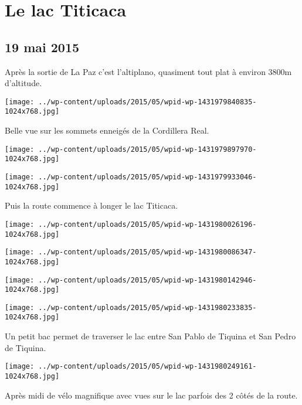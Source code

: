 \chapter{Le lac Titicaca}
\section*{19 mai 2015}
Après la sortie de La Paz c'est l'altiplano, quasiment tout plat à environ 3800m d'altitude. \newline
 \newline
\centerline{\texttt{[image: ../wp-content/uploads/2015/05/wpid-wp-1431979840835-1024x768.jpg]} } 
 \newline
 Belle vue sur les sommets enneigés de la Cordillera Real. \newline
 \newline
\centerline{\texttt{[image: ../wp-content/uploads/2015/05/wpid-wp-1431979897970-1024x768.jpg]} } 
 \newline
 \newline
\centerline{\texttt{[image: ../wp-content/uploads/2015/05/wpid-wp-1431979933046-1024x768.jpg]} } 
 \newline
 Puis la route commence à longer le lac Titicaca. \newline
 \newline
\centerline{\texttt{[image: ../wp-content/uploads/2015/05/wpid-wp-1431980026196-1024x768.jpg]} } 
 \newline
 \newline
\centerline{\texttt{[image: ../wp-content/uploads/2015/05/wpid-wp-1431980086347-1024x768.jpg]} } 
 \newline
 \newline
\centerline{\texttt{[image: ../wp-content/uploads/2015/05/wpid-wp-1431980142946-1024x768.jpg]} } 
 \newline
 \newline
\centerline{\texttt{[image: ../wp-content/uploads/2015/05/wpid-wp-1431980233835-1024x768.jpg]} } 
 \newline
 Un petit bac permet de traverser le lac entre San Pablo de Tiquina et San Pedro de Tiquina. \newline
 \newline
\centerline{\texttt{[image: ../wp-content/uploads/2015/05/wpid-wp-1431980249161-1024x768.jpg]} } 
 \newline
 Après midi de vélo magnifique avec vues sur le lac parfois des 2 côtés de la route. \newline
